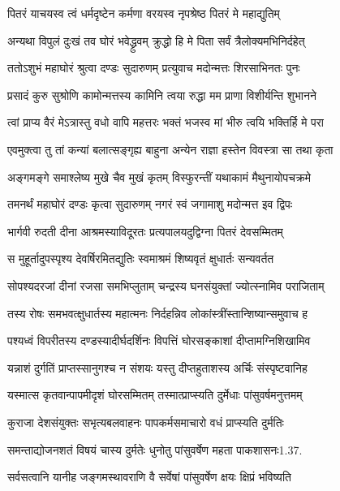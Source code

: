 \twolineshloka
{पितरं याचयस्व त्वं धर्मदृष्टेन कर्मणा}
{वरयस्व नृपश्रेष्ठ पितरं मे महाद्युतिम्}%

\twolineshloka
{अन्यथा विपुलं दुःखं तव घोरं भवेद्ध्रुवम्}
{क्रुद्धो हि मे पिता सर्वं त्रैलोक्यमभिनिर्दहेत्}%

\twolineshloka
{ततोऽशुभं महाघोरं श्रुत्वा दण्डः सुदारुणम्}
{प्रत्युवाच मदोन्मत्तः शिरसाभिनतः पुनः}%

\twolineshloka
{प्रसादं कुरु सुश्रोणि कामोन्मत्तस्य कामिनि}
{त्वया रुद्धा मम प्राणा विशीर्यन्ति शुभानने}%

\twolineshloka
{त्वां प्राप्य वैरं मेऽत्रास्तु वधो वापि महत्तरः}
{भक्तं भजस्व मां भीरु त्वयि भक्तिर्हि मे परा}%

\twolineshloka
{एवमुक्त्वा तु तां कन्यां बलात्सङ्गृह्य बाहुना}
{अन्येन राज्ञा हस्तेन विवस्त्रा सा तथा कृता}%

\twolineshloka
{अङ्गमङ्गे समाश्लेष्य मुखे चैव मुखं कृतम्}
{विस्फुरन्तीं यथाकामं मैथुनायोपचक्रमे}%

\twolineshloka
{तमनर्थं महाघोरं दण्डः कृत्वा सुदारुणम्}
{नगरं स्वं जगामाशु मदोन्मत्त इव द्विपः}%

\twolineshloka
{भार्गवी रुदती दीना आश्रमस्याविदूरतः}
{प्रत्यपालयदुद्विग्ना पितरं देवसम्मितम्}%

\twolineshloka
{स मुहूर्तादुपस्पृश्य देवर्षिरमितद्युतिः}
{स्वमाश्रमं शिष्यवृतं क्षुधार्तः सन्यवर्तत}%

\twolineshloka
{सोपश्यदरजां दीनां रजसा समभिप्लुताम्}
{चन्द्रस्य घनसंयुक्तां ज्योत्स्नामिव पराजिताम्}%

\twolineshloka
{तस्य रोषः समभवत्क्षुधार्तस्य महात्मनः}
{निर्दहन्निव लोकांस्त्रींस्तान्शिष्यान्समुवाच ह}%

\twolineshloka
{पश्यध्वं विपरीतस्य दण्डस्यादीर्घदर्शिनः}
{विपत्तिं घोरसङ्काशां दीप्तामग्निशिखामिव}%

\twolineshloka
{यन्नाशं दुर्गतिं प्राप्तस्सानुगश्च न संशयः}
{यस्तु दीप्तहुताशस्य अर्चिः संस्पृष्टवानिह}%

\twolineshloka
{यस्मात्स कृतवान्पापमीदृशं घोरसम्मितम्}
{तस्मात्प्राप्स्यति दुर्मेधाः पांसुवर्षमनुत्तमम्}%

\twolineshloka
{कुराजा देशसंयुक्तः सभृत्यबलवाहनः}
{पापकर्मसमाचारो वधं प्राप्स्यति दुर्मतिः}%

\twolineshloka
{समन्ताद्योजनशतं विषयं चास्य दुर्मतेः}
{धुनोतु पांसुवर्षेण महता पाकशासनः1.37.}%

\twolineshloka
{सर्वसत्वानि यानीह जङ्गमस्थावराणि वै}
{सर्वेषां पांसुवर्षेण क्षयः क्षिप्रं भविष्यति}%

